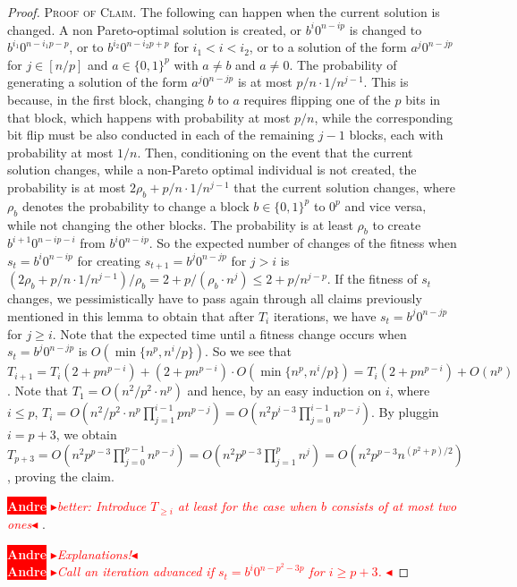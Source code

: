 \documentclass[
sigconf = false, %
review = false, %
screen = true, %
anonymous = true, %
format=acmsmall
]{acmart}
\newenvironment{proofofclaim}{\textsc{Proof of Claim.}}{\hfill\scriptsize\scalebox{1}{$\blacksquare$}}
\newcommand{\nbc}[3]{
		{\colorbox{#3}{\bfseries\sffamily\scriptsize\textcolor{white}{#1}}}
		{\textcolor{#3}{\sf\small$\blacktriangleright$\textit{#2}$\blacktriangleleft$}}
}
\newcommand{\andre}[1]{\nbc{Andre}{#1}{red}}
\begin{document}
\begin{proof}
\begin{proofofclaim}
The following can happen when the current solution is changed. A non Pareto-optimal solution is created, or $b^i0^{n-ip}$ is changed to $b^{i_1}0^{n-i_1p-p}$, or to $b^{i_2}0^{n-i_2p+p}$ for $i_1 < i < i_2$, or to a solution of the form $a^j0^{n-jp}$ for $j \in [n/p]$ and $a \in \{0,1\}^p$ with $a \neq b$ and $a \neq 0$. The probability of generating a solution of the form $a^j0^{n-jp}$ is at most $p/n \cdot  1/n^{j-1}$. This is because, in the first block, changing $b$ to $a$ requires flipping one of the $p$ bits in that block, which happens with probability at most $p/n$, while the corresponding bit flip must be also conducted in each of the remaining $j-1$ blocks, each with probability at most $1/n$. Then, conditioning on the event that the current solution changes, while a non-Pareto optimal individual is not created, the probability is at most $2 \rho_b + p/n \cdot 1/n^{j-1}$ that the current solution changes, where $\rho_b$ denotes the probability to change a block $b \in \{0,1\}^p$ to $0^p$ and vice versa, while not changing the other blocks. The probability is at least $\rho_b$ to create $b^{i+1}0^{n-ip-i}$ from $b^i0^{n-ip}$. So the expected number of changes of the fitness when $s_t=b^i0^{n-ip}$ for creating $s_{t+1}=b^{j}0^{n-jp}$ for $j>i$ is $(2\rho_b + p/n \cdot 1/n^{j-1})/\rho_b = 2+p/ (\rho_b \cdot n^j) \leq 2+p/ n^{j-p}$. If the fitness of $s_t$ changes, we pessimistically have to pass again through all claims previously mentioned in this lemma to obtain that after $T_i$ iterations, we have $s_t =b^j0^{n-jp}$ for $j \geq i$. Note that the expected time until a fitness change occurs when $s_t =b^j0^{n-jp}$ is $O(\min\{n^p,n^i/p\})$. So we see that $T_{i+1} = T_i(2+pn^{p-i}) + (2+pn^{p-i}) \cdot O(\min\{n^p,n^i/p\}) = T_i(2+pn^{p-i}) + O(n^p)$. Note that $T_1=O(n^2/p^2 \cdot n^p)$ and hence, by an easy induction on $i$, where $i \leq p$, $T_i=O(n^2/p^2 \cdot n^p \prod_{j=1}^{i-1} pn^{p-j}) = O(n^2p^{i-3} \prod_{j=0}^{i-1} n^{p-j})$. By pluggin $i=p+3$, we obtain $T_{p+3} = O(n^2p^{p-3} \prod_{j=0}^{p-1} n^{p-j}) = O(n^2p^{p-3} \prod_{j=1}^{p} n^j) = O(n^2p^{p-3} n^{(p^2+p)/2})$, proving the claim.  

\andre{better: Introduce $T_{\geq i}$ at least for the case when $b$ consists of at most two ones}.    
\end{proofofclaim}

\andre{Explanations!}\\
\andre{Call an iteration \emph{advanced} if $s_t =b^i0^{n-p^2-3p}$ for $i \geq p+3$. }


\end{proof}
\end{document}
